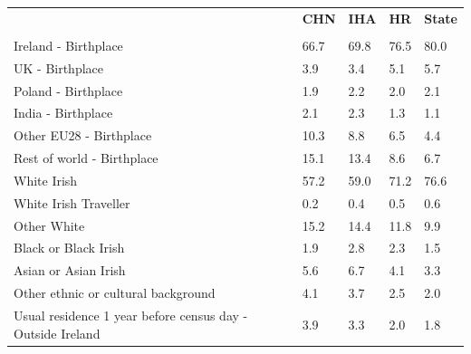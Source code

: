 \documentclass{article}
\begin{document}
\pagebreak
\begin{table}[h]	
\centering
		\begin{tabular}{KTTTT}
  \hline
& \textbf{CHN} & \textbf{IHA} & \textbf{HR}& \textbf{State}\\ 
  \hline
    \\ 
    \hline
Ireland - Birthplace & 66.7& 69.8& 76.5& 80.0\\
UK - Birthplace & 3.9& 3.4& 5.1& 5.7\\
Poland - Birthplace & 1.9& 2.2& 2.0& 2.1\\
India - Birthplace & 2.1& 2.3& 1.3& 1.1\\
Other EU28 - Birthplace & 10.3&  8.8&  6.5&  4.4\\
Rest of world - Birthplace & 15.1& 13.4&  8.6&  6.7\\
    \hline
White Irish & 57.2& 59.0& 71.2& 76.6\\
White Irish Traveller & 0.2& 0.4& 0.5& 0.6\\
Other White & 15.2& 14.4& 11.8&  9.9\\
Black or Black Irish & 1.9& 2.8& 2.3& 1.5\\
Asian or Asian Irish & 5.6& 6.7& 4.1& 3.3\\
Other ethnic or cultural background & 4.1& 3.7& 2.5& 2.0\\
    \hline
Usual residence 1 year before census day - Outside Ireland & 3.9& 3.3& 2.0& 1.8\\


\end{tabular}
\end{table}
\end{document}
